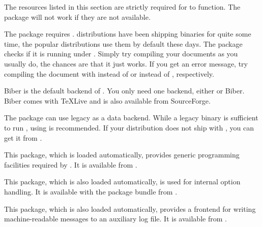 \documentclass{ltxdockit}[2011/03/25]
\newcommand*{\biber}{Biber\xspace}
\begin{document}
The resources listed in this section are strictly required for  to function. The package will not work if they are not available.

\begin{marglist}

\item[\etex]
The  package requires \etex. \tex distributions have been shipping \etex binaries for quite some time, the popular distributions use them by default these days. The  package checks if it is running under \etex. Simply try compiling your documents as you usually do, the chances are that it just works. If you get an error message, try compiling the document with  instead of  or  instead of , respectively.

\item[\biber]
\biber is the default backend of . You only need one backend, either \bibtex or \biber. \biber comes with TeXLive and is also available from SourceForge.

\item[\bibtex]
The  package can use legacy \bibtex as a data backend. While a legacy \bibtex binary is sufficient to run , using  is recommended. If your \tex distribution does not ship with , you can get it from .

\item[etoolbox]
This \latex package, which is loaded automatically, provides generic programming facilities required by . It is available from .

\item[kvoptions]
This \latex package, which is also loaded automatically, is used for internal option handling. It is available with the  package bundle from .

\item[logreq]
This \latex package, which is also loaded automatically, provides a frontend for writing machine-readable messages to an auxiliary log file. It is available from .

\end{marglist}
\end{document}

